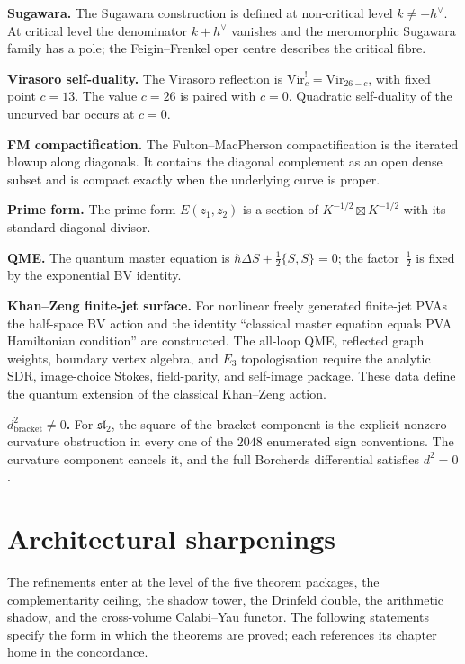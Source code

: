 \smallskip\noindent\textbf{Sugawara.}
The Sugawara construction is defined at non-critical level
$k\ne-h^\vee$. At critical level the denominator $k+h^\vee$ vanishes
and the meromorphic Sugawara family has a pole; the Feigin--Frenkel
oper centre describes the critical fibre.

\smallskip\noindent\textbf{Virasoro self-duality.}
The Virasoro reflection is $\mathrm{Vir}_c^!=\mathrm{Vir}_{26-c}$,
with fixed point $c=13$. The value $c=26$ is paired with $c=0$.
Quadratic self-duality of the uncurved bar occurs at $c=0$.

\smallskip\noindent\textbf{FM compactification.}
The Fulton--MacPherson compactification is the iterated blowup along
diagonals. It contains the diagonal complement as an open dense subset
and is compact exactly when the underlying curve is proper.

\smallskip\noindent\textbf{Prime form.}
The prime form $E(z_1,z_2)$ is a section of
$K^{-1/2}\boxtimes K^{-1/2}$ with its standard diagonal divisor.

\smallskip\noindent\textbf{QME.}
The quantum master equation is
$\hbar\Delta S+\frac12\{S,S\}=0$; the factor~$\frac12$ is fixed by
the exponential BV identity.

\smallskip\noindent\textbf{Khan--Zeng finite-jet surface.}
For nonlinear freely generated finite-jet PVAs the half-space BV action
and the identity ``classical master equation equals PVA Hamiltonian
condition'' are constructed. The all-loop QME, reflected graph weights,
boundary vertex algebra, and $E_3$ topologisation require the analytic
SDR, image-choice Stokes, field-parity, and self-image package. These
data define the quantum extension of the classical Khan--Zeng action.

\smallskip\noindent\textbf{$d_{\mathrm{bracket}}^2 \neq 0$.}
For $\mathfrak{sl}_2$, the square of the bracket component is the
explicit nonzero curvature obstruction in every one of the $2048$
enumerated sign conventions. The curvature component cancels it, and
the full Borcherds differential satisfies $d^2=0$.

\section{Architectural sharpenings}
\label{sec:architectural-sharpenings}

The refinements enter at the level of the five theorem packages, the
complementarity ceiling, the shadow tower, the Drinfeld double, the
arithmetic shadow, and the cross-volume Calabi--Yau functor. The
following statements specify the form in which the theorems are
 proved; each references its chapter home in the concordance.

